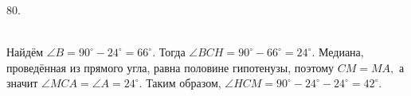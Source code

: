 80. \begin{figure}[ht!]
\end{figure}\\
Найдём $\angle B=90^\circ-24^\circ=66^\circ.$ Тогда $\angle BCH=90^\circ-66^\circ=24^\circ.$ Медиана, проведённая из прямого угла, равна половине гипотенузы, поэтому $CM=MA,$ а значит $\angle MCA=\angle A=24^\circ.$ Таким образом, $\angle HCM=90^\circ-24^\circ-24^\circ=42^\circ.$\\
